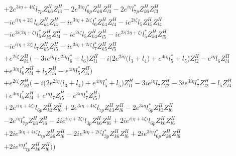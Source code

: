 \begin{align}
 &+2 e^{3 i \eta +4 i \zeta } l_{7p} Z_{{k 6}}^{H} Z_{{l 3}}^{H} -2 e^{3 i \eta } l_{6p}^* Z_{{k 6}}^{H} Z_{{l 3}}^{H} -2 e^{i \eta } l_{7p}^* Z_{{k 6}}^{H} Z_{{l 3}}^{H} \nonumber \\ 
 &-i e^{i \Big(\eta +2 \zeta \Big)} l_6 Z_{{k 4}}^{H} Z_{{l 4}}^{H} -i e^{3 i \eta +2 i \zeta } l_6^* Z_{{k 4}}^{H} Z_{{l 4}}^{H} -i e^{2 i \zeta } l_5 Z_{{k 5}}^{H} Z_{{l 4}}^{H} \nonumber \\ 
 &-i e^{2 i \Big(2 \eta +\zeta \Big)} l_5^* Z_{{k 5}}^{H} Z_{{l 4}}^{H} -i e^{2 i \zeta } l_5 Z_{{k 4}}^{H} Z_{{l 5}}^{H} -i e^{2 i \Big(2 \eta +\zeta \Big)} l_5^* Z_{{k 4}}^{H} Z_{{l 5}}^{H} \nonumber \\ 
 &-i e^{i \Big(\eta +2 \zeta \Big)} l_7 Z_{{k 5}}^{H} Z_{{l 5}}^{H} -i e^{3 i \eta +2 i \zeta } l_7^* Z_{{k 5}}^{H} Z_{{l 5}}^{H} \nonumber \\ 
 &+e^{2 i \zeta } Z_{{k 1}}^{H} \Big(-3 i e^{i \eta } \Big(e^{2 i \eta } l_6^*  + l_6\Big)Z_{{l 1}}^{H} -i \Big(2 e^{2 i \eta } \Big(l_3 + l_4\Big) + e^{4 i \eta } l_5^*  + l_5\Big)Z_{{l 2}}^{H} - e^{i \eta } l_6 Z_{{l 4}}^{H} \nonumber \\ 
 &+e^{3 i \eta } l_6^* Z_{{l 4}}^{H} +l_5 Z_{{l 5}}^{H} - e^{4 i \eta } l_5^* Z_{{l 5}}^{H} \Big)\nonumber \\ 
 &+e^{2 i \zeta } Z_{{k 2}}^{H} \Big(-i \Big(2 e^{2 i \eta } \Big(l_3 + l_4\Big) + e^{4 i \eta } l_5^*  + l_5\Big)Z_{{l 1}}^{H} -3 i e^{i \eta } l_7 Z_{{l 2}}^{H} -3 i e^{3 i \eta } l_7^* Z_{{l 2}}^{H} - l_5 Z_{{l 4}}^{H} \nonumber \\ 
 &+e^{4 i \eta } l_5^* Z_{{l 4}}^{H} +e^{i \eta } l_7 Z_{{l 5}}^{H} - e^{3 i \eta } l_7^* Z_{{l 5}}^{H} \Big)\nonumber \\ 
 &+2 e^{i \Big(\eta +4 \zeta \Big)} l_{6p} Z_{{k 3}}^{H} Z_{{l 6}}^{H} +2 e^{3 i \eta +4 i \zeta } l_{7p} Z_{{k 3}}^{H} Z_{{l 6}}^{H} -2 e^{3 i \eta } l_{6p}^* Z_{{k 3}}^{H} Z_{{l 6}}^{H} \nonumber \\ 
 &-2 e^{i \eta } l_{7p}^* Z_{{k 3}}^{H} Z_{{l 6}}^{H} -2 i e^{i \Big(\eta +2 \zeta \Big)} l_{3p} Z_{{k 6}}^{H} Z_{{l 6}}^{H} +2 i e^{i \Big(\eta +4 \zeta \Big)} l_{6p} Z_{{k 6}}^{H} Z_{{l 6}}^{H} \nonumber \\ 
 &+2 i e^{3 i \eta +4 i \zeta } l_{7p} Z_{{k 6}}^{H} Z_{{l 6}}^{H} -2 i e^{3 i \eta +2 i \zeta } l_{3p}^* Z_{{k 6}}^{H} Z_{{l 6}}^{H} +2 i e^{3 i \eta } l_{6p}^* Z_{{k 6}}^{H} Z_{{l 6}}^{H} \nonumber \\ 
 &+2 i e^{i \eta } l_{7p}^* Z_{{k 6}}^{H} Z_{{l 6}}^{H} \Big)\Big)\nonumber \\ 

\end{align}
